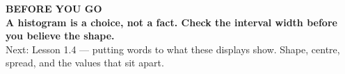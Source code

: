 \documentclass[aspectratio=169, 11pt]{beamer}
\begin{document}
{
\begin{frame}[plain]
  \vspace{1.5cm}\hspace{0.8cm}%
  \begin{minipage}{0.86\textwidth}
    {\color{goldacc}\bfseries\small BEFORE YOU GO}\\[0.7cm]
    {\color{white}\bfseries\Large A histogram is a choice, not a fact. Check the interval
    width before you believe the shape.}\\[0.9cm]
    {\color{skymid}\small Next: Lesson 1.4 --- putting words to what these displays show.
    Shape, centre, spread, and the values that sit apart.}
  \end{minipage}
\end{frame}
}
\end{document}
